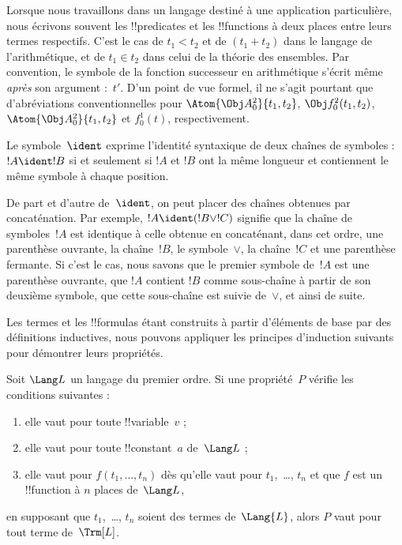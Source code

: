 \documentclass[../../../include/open-logic-section]{subfiles}
\begin{document}
Lorsque nous travaillons dans un langage destiné à une application
particulière, nous écrivons souvent les !!{predicate}s et les
!!{function}s à deux places entre leurs termes respectifs. C'est le
cas de $t_1 < t_2$ et de $(t_1 + t_2)$ dans le langage de
l'arithmétique, et de $t_1 \in t_2$ dans celui de la théorie des
ensembles. Par convention, le symbole de la fonction successeur en
arithmétique s'écrit même \emph{après} son argument :~$t'$. D'un
point de vue formel, il ne s'agit pourtant que d'abréviations
conventionnelles pour $\Atom{\Obj A^2_0}{t_1, t_2}$,
$\Obj f^2_0(t_1, t_2)$, $\Atom{\Obj A^2_0}{t_1, t_2}$ et
$f^1_0(t)$, respectivement.

\begin{defn}
Le symbole~$\ident$ exprime l'identité syntaxique de deux chaînes de
symboles : $!A \ident !B$ si et seulement si $!A$ et $!B$ ont la même
longueur et contiennent le même symbole à chaque position.
\end{defn}

De part et d'autre de~$\ident$, on peut placer des chaînes obtenues
par concaténation. Par exemple, $!A \ident (!B \lor !C)$ signifie
que la chaîne de symboles~$!A$ est identique à celle obtenue en
concaténant, dans cet ordre, une parenthèse ouvrante, la chaîne~$!B$,
le symbole~$\lor$, la chaîne~$!C$ et une parenthèse fermante. Si
c'est le cas, nous savons que le premier symbole de~$!A$ est une
parenthèse ouvrante, que $!A$ contient $!B$ comme sous-chaîne à
partir de son deuxième symbole, que cette sous-chaîne est suivie
de~$\lor$, et ainsi de suite.

Les termes et les !!{formula}s étant construits à partir d'éléments
de base par des définitions inductives, nous pouvons appliquer les
principes d'induction suivants pour démontrer leurs propriétés.

\begin{lem}
    Soit $\Lang L$ un langage du premier ordre.
    Si une propriété~$P$ vérifie les conditions suivantes :
    \begin{enumerate}
        \item elle vaut pour toute !!{variable}~$v$ ;
        \item elle vaut pour toute !!{constant}~$a$ de~$\Lang L$ ;
        \item elle vaut pour $f(t_1,\dotsc,t_n)$ dès qu'elle vaut
        pour $t_1$,~\dots, $t_n$ et que $f$ est un !!{function}
        à $n$ places de~$\Lang L$,
    \end{enumerate}
    en supposant que $t_1$,~\dots, $t_n$ soient des termes de~$\Lang{L}$,
    alors $P$ vaut pour tout terme de~$\Trm[L]$.
\end{lem}
\end{document}
